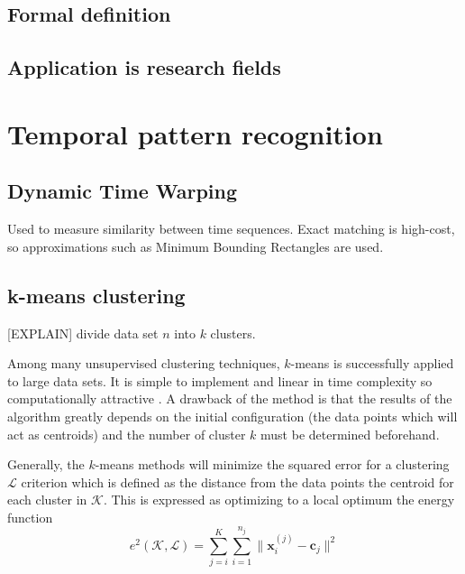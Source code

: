 
\subsection{Formal definition}






\subsection{Application is research fields}



\section{Temporal pattern recognition}

\subsection{Dynamic Time Warping}
Used to measure similarity between time sequences. Exact matching is
high-cost, so approximations such as Minimum Bounding Rectangles are used.

\subsection{k-means clustering}
[EXPLAIN] divide data set $n$ into $k$ clusters.

Among many unsupervised clustering techniques, $k$-means is successfully
applied to large data sets. It is simple to implement and linear in time
complexity so computationally attractive \cite{jain1999data}. A drawback of
the method is that the results of the algorithm greatly depends on the initial
configuration (the data points which will act as centroids) and the number of
cluster $k$ must be determined beforehand.

Generally, the $k$-means methods will minimize the squared error for a
clustering $\mathcal{L}$ criterion which is defined as the distance from the
data points the centroid for each cluster in $\mathcal{K}$. This is expressed
as optimizing to a local optimum the energy function
\begin{equation} \label{eq:k-means energy}
e^2(\mathcal{K},\mathcal{L}) =
\sum_{j=i}^{K}\sum_{i=1}^{n_j}\|\mathbf{x}_i^{(j)} -
\mathbf{c}_j\|^2
\end{equation}

